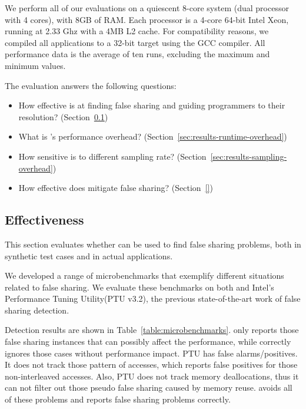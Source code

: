 \label{sec:evaluation}

We perform all of our evaluations on a quiescent 8-core system (dual processor with 4 cores), with 8GB of RAM. Each processor is a 4-core 64-bit Intel Xeon, running at 2.33 Ghz with a 4MB L2 cache. For compatibility reasons, we compiled all applications to a 32-bit target using the GCC compiler. All performance data is the average of ten runs, excluding the maximum and minimum values.

The evaluation answers the following questions:

\begin{itemize}
\item How effective is \sheriffdetect{} at finding false sharing and guiding programmers to their resolution? (Section~\ref{sec:effecteval})
\item What is \sheriffdetect{}'s performance overhead? (Section~\ref{sec:results-runtime-overhead})
\item How sensitive is \sheriffdetect{} to different sampling rate? (Section~\ref{sec:results-sampling-overhead}) 
\item How effective does \sheriffprotect{} mitigate false sharing? (Section~\ref{})
\end{itemize}

\subsection{\sheriffdetect{} Effectiveness}

\label{sec:effecteval}

This section evaluates whether \sheriffdetect{} can be used to find false sharing problems, both in synthetic test cases and in actual applications.

We developed a range of microbenchmarks that exemplify different situations related to false sharing. We evaluate these benchmarks on both \SheriffDetect{} and Intel's Performance Tuning Utility(PTU v3.2), the previous state-of-the-art work of false sharing detection. 

Detection results are shown in Table~\ref{table:microbenchmarks}. \sheriffdetect{} only reports those false sharing instances that can possibly affect the performance, while correctly ignores those cases without performance impact.
PTU has false alarms/positives.  It does not track those pattern of accesses, which reports false positives for those non-interleaved accesses. Also, PTU does not track memory deallocations, thus it can not filter out those pseudo false sharing caused by memory reuse. \sheriffdetect{} avoids all of these problems and reports false sharing problems correctly. 


